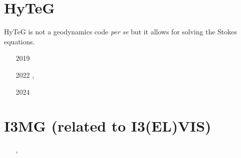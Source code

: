 
\section{HyTeG}

HyTeG is not a geodynamics code {\it per se} but it allows for solving 
the Stokes equations. 

\begin{small}
\begin{itemize}
\item[2019] \textcite{kotd19}
\item[2022] \textcite{kome22}, \textcite{koru22}
\item[2024] \textcite{ildk24}
\end{itemize}
\end{small}




\section{I3MG (related to I3(EL)VIS)}

\begin{small}
\begin{itemize}
\item[\twothousandfourteen] \textcite{facc14}
\item[\twothousandsixteen]  \textcite{chff16}
\item[\twothousandnineteen] \textcite{stff19}, \textcite{fefs19}
\end{itemize}
\end{small}

